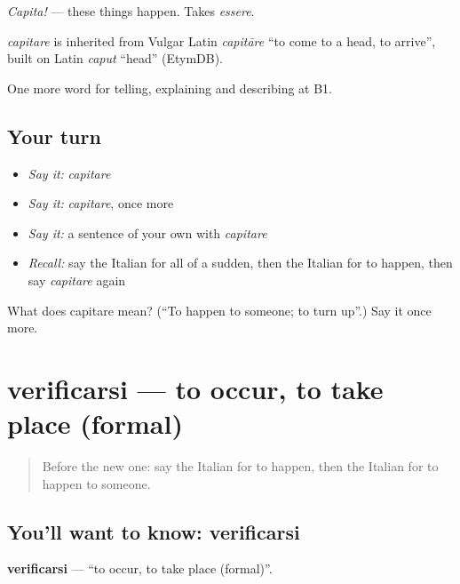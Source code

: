 \emph{Capita!} — these things happen. Takes \emph{essere}.

\begin{cousinweb}
\emph{capitare} is inherited from Vulgar Latin \emph{capitāre} \textquotedblleft{}to come to a head, to arrive\textquotedblright{}, built on Latin \emph{caput} \textquotedblleft{}head\textquotedblright{} (EtymDB).
\end{cousinweb}

\begin{grammarlens}[title={What you've built}]
One more word for telling, explaining and describing at B1.
\end{grammarlens}

\subsection*{Your turn}
\begin{itemize}
\raggedright
  \item \emph{Say it:} \emph{capitare}
  \item \emph{Say it:} \emph{capitare}, once more
  \item \emph{Say it:} a sentence of your own with \emph{capitare}
  \item \emph{Recall:} say the Italian for all of a sudden, then the Italian for to happen, then say \emph{capitare} again
\end{itemize}

\begin{tcolorbox}[breakable,colback=teal!4,colframe=teal!35!black,title={Before you move on}]
What does capitare mean? (\textquotedblleft{}To happen to someone; to turn up\textquotedblright{}.) Say it once more.
\end{tcolorbox}
\section[verificarsi]{verificarsi — to occur, to take place (formal)}

\label{lesson:IT-C275-verificarsi}



\begin{quote}
Before the new one: say the Italian for to happen, then the Italian for to happen to someone.
\end{quote}

\subsection*{You'll want to know: verificarsi}
\textbf{verificarsi} — \textquotedblleft{}to occur, to take place (formal)\textquotedblright{}.

